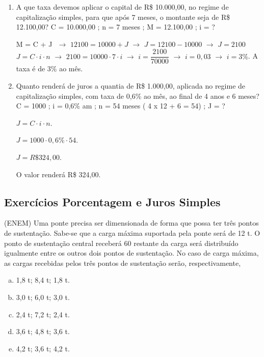 \begin{multicols*}{2}
\begin{enumerate}[wide, labelwidth=!, labelindent=0pt]
		\item A que taxa devemos aplicar o capital de R\$ 10.000,00, no regime de capitalização simples, para que após 7 meses, o montante seja de R\$ 12.100,00?  C = 10.000,00  ;  n = 7 meses  ;  M = 12.100,00 ;  i = ?

		      M = C + J $\, \, \rightarrow \, \, 12100 = 10000 + J \, \, \rightarrow \, \, J = 12100 - 10000 \, \, \rightarrow \, \, J = 2100$\\

		      $ J = C \cdot i \cdot n \, \, \rightarrow \, \,2100 = 10000 \cdot 7 \cdot i \, \, \rightarrow \, \, i = \dfrac{2100}{70000} \, \, \rightarrow \, \, i = 0,03 \, \, \rightarrow \, \, i = 3\% $. A taxa é de 3\% ao mês.

		\item Quanto renderá de juros a quantia de R\$ 1.000,00, aplicada no regime de capitalização simples, com taxa de 0,6\% ao mês, ao final de 4 anos e 6 meses? C = 1000 ; i = 0,6\% am ; n = 54 meses ( 4 x 12 + 6 = 54) ; J = ?

		      $ J = C \cdot i \cdot n$.

		      $ J = 1000 \cdot 0,6\% \cdot 54 $.

		      $ J = R\$ 324,00 $.

		      O valor renderá R\$ 324,00.

	\end{enumerate}

	\subsection*{Exercícios Porcentagem e Juros Simples}

	\setcounter{numexercicio}{0}
	\execnum (ENEM) Uma ponte precisa ser dimensionada de forma que possa ter três pontos de sustentação. Sabe-se que a carga máxima suportada pela ponte será de 12 t. O ponto de sustentação central receberá 60%
	restante da carga será distribuído igualmente entre os outros dois pontos de sustentação. No caso de carga máxima, as cargas recebidas pelos três pontos de sustentação serão, respectivamente,
	\begin{enumerate}[(a)]
		\item 1,8 t; 8,4 t; 1,8 t.
		\item 3,0 t; 6,0 t; 3,0 t.
		\item 2,4 t; 7,2 t; 2,4 t.
		\item 3,6 t; 4,8 t; 3,6 t.
		\item 4,2 t; 3,6 t; 4,2 t.
	\end{enumerate}


\end{multicols*}
